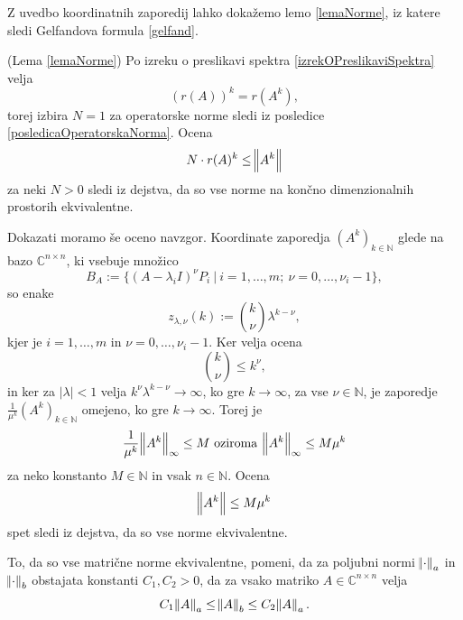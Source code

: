 \documentclass[mat1]{fmfdelo}
\newcommand{\N}{\mathbb N}
\newcommand{\C}{\mathbb C}
\begin{document}
Z uvedbo koordinatnih zaporedij lahko dokažemo lemo \ref{lemaNorme}, iz katere sledi Gelfandova formula \ref{gelfand}.
\begin{dokaz}
    (Lema \ref{lemaNorme}) Po izreku o preslikavi spektra  \ref{izrekOPreslikaviSpektra} velja
    \begin{equation*}
        \left(r(A)\right)^k = r(A^k),
    \end{equation*}
    torej izbira $N = 1$ za operatorske norme sledi iz posledice \ref{posledicaOperatorskaNorma}. Ocena
    \begin{equation*}
        N \cdot r(A)^k \leq \norm{A^k}
    \end{equation*}
    za neki $N > 0$ sledi iz dejstva, da so vse norme na končno dimenzionalnih prostorih ekvivalentne.

    Dokazati moramo še oceno navzgor. Koordinate zaporedja $(A^k)_{k\in\N}$ glede na bazo $\C^{n \times n}$, ki vsebuje množico
    \begin{equation*}
        B_A := \{(A-\lambda_i I)^{\nu} P_i\ |\ i = 1, \ldots, m;\ \nu = 0, \ldots, \nu_i - 1\},
    \end{equation*}
    so enake
    \begin{equation*}
        z_{\lambda, \nu} (k) := {k \choose \nu} \lambda^{k - \nu},
    \end{equation*}
    kjer je $i = 1, \ldots, m$ in $\nu = 0, \ldots, \nu_i-1$. Ker velja ocena
    \begin{equation*}
        {k \choose \nu} \leq k^\nu,
    \end{equation*}
    in ker za $|\lambda| < 1$ velja $k^\nu \lambda^{k-\nu} \rightarrow \infty$, ko gre $k\rightarrow \infty$, za vse $\nu \in \N$, je zaporedje $\frac{1}{\mu^k}(A^k)_{k\in\N}$ omejeno, ko gre $k\rightarrow \infty$. Torej je
    \begin{equation*}
        \frac{1}{\mu^k} \norm{A^k}_\infty \leq M\ \text{oziroma}\ \norm{A^k}_\infty \leq M \mu^k
    \end{equation*}
    za neko konstanto $M \in \N$ in vsak $n \in \N$. Ocena
    \begin{equation*}
        \norm{A^k} \leq M \mu^k
    \end{equation*}
    spet sledi iz dejstva, da so vse norme ekvivalentne.
\end{dokaz}
\begin{opomba}
    To, da so vse matrične norme ekvivalentne, pomeni, da za poljubni normi $\norm{\cdot}_a$ in $\norm{\cdot}_b$ obstajata konstanti $C_1, C_2 > 0$, da za vsako matriko $A \in \C^{n \times n}$ velja
    \begin{equation*}
        C_1 \norm{A}_a \leq \norm{A}_b \leq C_2 \norm{A}_a.
    \end{equation*}
\end{opomba}
\end{document}
